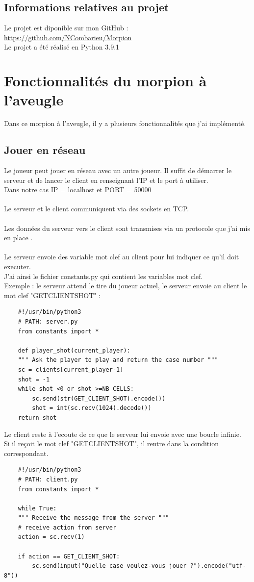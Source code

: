 \documentclass{article}
\begin{document}
\subsection{Informations relatives au projet}
Le projet est diponible sur mon GitHub :
\url{https://github.com/NCombarieu/Morpion} \\
Le projet a été réalisé en Python 3.9.1 \\

\section{Fonctionnalités du morpion à l'aveugle}
Dans ce morpion à l'aveugle, il y a plusieurs fonctionnalités que j'ai implémenté.

\subsection{Jouer en réseau}
Le joueur peut jouer en réseau avec un autre joueur. Il suffit de démarrer le serveur et de lancer le client en renseignant l'IP et le port à utiliser. \\
Dans notre cas IP = localhost et PORT = 50000 \\\\
Le serveur et le client communiquent via des sockets en TCP. \\\\
Les données du serveur vers le client sont transmises via un protocole que j'ai mis en place . \\\\
Le serveur envoie des variable mot clef au client pour lui indiquer ce qu'il
doit executer.\\
J'ai ainsi le fichier constants.py qui contient les variables mot clef.\\
Exemple : le serveur attend le tire du joueur actuel, le serveur envoie au client le mot clef "GET\textunderscore CLIENT\textunderscore SHOT" :\\
\begin{lstlisting}
    #!/usr/bin/python3
    # PATH: server.py
    from constants import *

    def player_shot(current_player):
    """ Ask the player to play and return the case number """
    sc = clients[current_player-1]
    shot = -1
    while shot <0 or shot >=NB_CELLS:
        sc.send(str(GET_CLIENT_SHOT).encode())
        shot = int(sc.recv(1024).decode())
    return shot
\end{lstlisting}
Le client reste à l'ecoute de ce que le serveur lui envoie avec une boucle infinie.\\
Si il reçoit le mot clef "GET\textunderscore CLIENT\textunderscore SHOT", il rentre dans la condition correspondant.\\
\begin{lstlisting}
    #!/usr/bin/python3
    # PATH: client.py
    from constants import *

    while True:
    """ Receive the message from the server """
    # receive action from server
    action = sc.recv(1)

    if action == GET_CLIENT_SHOT:
        sc.send(input("Quelle case voulez-vous jouer ?").encode("utf-8"))
\end{lstlisting}
\newpage
\end{document}
